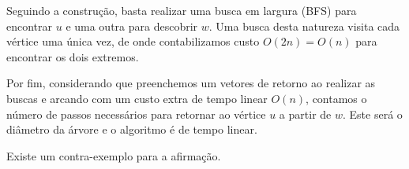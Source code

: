 \documentclass{homework}
\begin{document}
	Seguindo a construção, basta realizar uma busca em largura (BFS) para encontrar $u$ e uma outra para descobrir $w$. Uma busca desta natureza visita cada vértice uma única vez, de onde contabilizamos custo $O(2 n) = O(n)$ para encontrar os dois extremos.\par
	
	Por fim, considerando que preenchemos um vetores de retorno ao realizar as buscas e arcando com um custo extra de tempo linear $O(n)$, contamos o número de passos necessários para retornar ao vértice $u$ a partir de $w$. Este será o diâmetro da árvore e o algoritmo é de tempo linear.
	
	\quest %
	
	\begin{supposition}
		Existe um contra-exemplo para a afirmação.
	\end{supposition}
	
\end{document}
